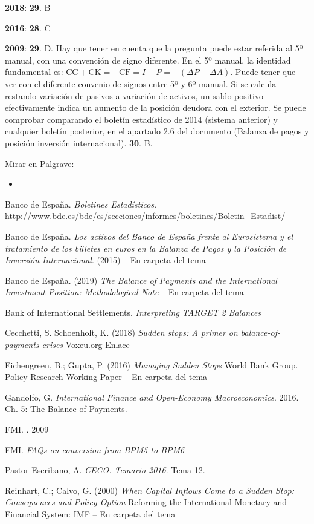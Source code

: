 \documentclass{nuevotema}
\begin{document}
\notas

\textbf{2018}: \textbf{29}. B

\textbf{2016}: \textbf{28}. C

\textbf{2009}: \textbf{29}. D. Hay que tener en cuenta que la pregunta puede estar referida al 5º manual, con una convención de signo diferente. En el 5º manual, la identidad fundamental es: $\text{CC} + \text{CK} = - \text{CF} = I - P = - (\varDelta P - \varDelta A)$. Puede tener que ver con el diferente convenio de signos entre 5º y 6º manual. Si  se calcula restando variación de pasivos a variación de activos, un saldo positivo efectivamente indica un aumento de la posición deudora con el exterior. Se puede comprobar comparando el boletín estadístico de 2014 (sistema anterior) y cualquier boletín posterior, en el apartado 2.6 del documento (Balanza de pagos y posición inversión internacional). \textbf{30}. B.

\bibliografia

Mirar en Palgrave:
\begin{itemize}
	\item
\end{itemize}

Banco de España. \textit{Boletines Estadísticos}. http://www.bde.es/bde/es/secciones/informes/boletines/Boletin\_Estadist/

Banco de España. \textit{Los activos del Banco de España frente al Eurosistema y el tratamiento de los billetes en euros en la Balanza de Pagos y la Posición de Inversión Internacional}. (2015) -- En carpeta del tema

Banco de España. (2019) \textit{The Balance of Payments and the International Investment Position: Methodological Note} -- En carpeta del tema

Bank of International Settlements. \textit{Interpreting TARGET 2 Balances}

Cecchetti, S. Schoenholt, K. (2018) \textit{Sudden stops: A primer on balance-of-payments crises} Voxeu.org \href{https://voxeu.org/content/sudden-stops-primer-balance-payments-crises}{Enlace}

Eichengreen, B.; Gupta, P. (2016) \textit{Managing Sudden Stops} World Bank Group. Policy Research Working Paper -- En carpeta del tema


Gandolfo, G. \textit{International Finance and Open-Economy Macroeconomics}. 2016. Ch. 5: The Balance of Payments.

FMI. . 2009

FMI. \textit{FAQs on conversion from BPM5 to BPM6}

Pastor Escribano, A. \textit{CECO. Temario 2016}. Tema 12.

Reinhart, C.; Calvo, G. (2000) \textit{When Capital Inflows Come to a Sudden Stop: Consequences and Policy Option} Reforming the International Monetary and Financial System: IMF -- En carpeta del tema 
\end{document}
